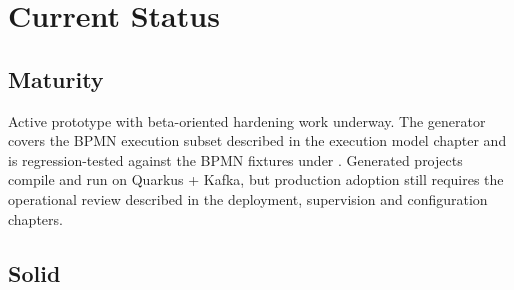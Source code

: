\section{Current Status}
\label{sec:CurrentStatus}

\subsection{Maturity}

Active prototype with beta-oriented hardening work underway. The generator
covers the BPMN execution subset described in the execution model chapter and
is regression-tested against the BPMN fixtures under
. Generated projects compile and run on
Quarkus + Kafka, but production adoption still requires the operational review
described in the deployment, supervision and configuration chapters.

\subsection{Solid}

